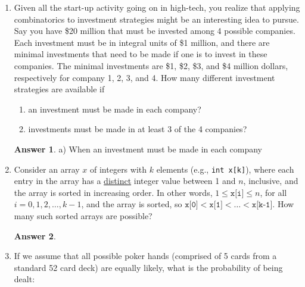 \documentclass[12pt]{article}
\renewcommand{\(}{\left(}
\renewcommand{\)}{\right)}
\theoremstyle{definition}
\newtheorem*{answer}{Answer}
\begin{document}
\begin{enumerate}
\item Given all the start-up activity going on in high-tech, you realize that applying combinatorics to investment strategies might be an interesting idea to pursue.  
      Say you have \$20 million that must be invested among 4 possible companies.
      Each investment must be in integral units of \$1 million, and there are minimal investments that need to be made if one is to invest in these companies.  
      The minimal investments are \$1, \$2, \$3, and \$4 million dollars, respectively for company 1, 2, 3, and 4.  How many different investment strategies are available if
    \begin{enumerate}[label=\alph*.]

    \item an investment must be made in each company?
    \item investments must be made in at least 3 of the 4 companies?

    \end{enumerate}

    \begin{shaded}
    \begin{answer}
        a) When an investment must be made in each company

    \end{answer}
    \end{shaded}
    \newpage


\item Consider an array $x$ of integers with $k$ elements (e.g., \texttt{int x[k]}), where each entry in the array has a \underline{distinct} integer value between 1 and $n$, inclusive, and the array is sorted in increasing order. In other words, $1 \leq \texttt{x[i]} \leq n$, for all $i = 0, 1, 2, \dotsc, k - 1$, and the array is sorted, so $\texttt{x[0]} < \texttt{x[1]} < \dotsc < \texttt{x[k-1]}$.  How many such sorted arrays are possible?

    \begin{shaded}
    \begin{answer}

    \end{answer}
    \end{shaded}
    \newpage


\item If we assume that all possible poker hands (comprised of 5 cards from a standard 52 card deck) are equally likely, what is the probability of being dealt:
    \begin{enumerate}[label=\alph*.]


\end{enumerate}
\end{enumerate}
\end{document}
